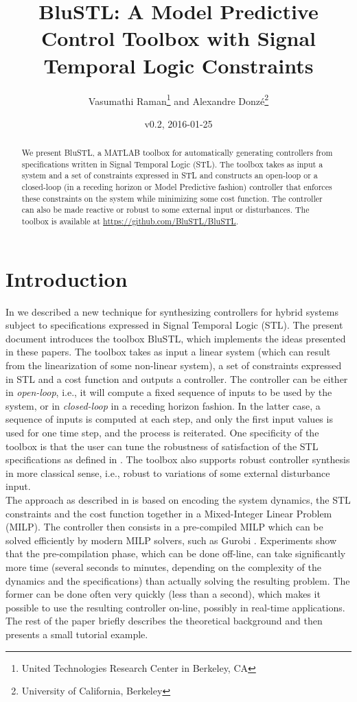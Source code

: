 \documentclass[hyperref, xcolor=dvipsnames, 10pt]{article} %
\title{BluSTL: A Model Predictive Control Toolbox with Signal Temporal Logic Constraints}
\author{
Vasumathi Raman\footnote{United Technologies Research Center in Berkeley, CA}\hspace{1ex}
 and Alexandre Donz\'e\footnote{University of California, Berkeley}
}
\date{v0.2, 2016-01-25 }
\begin{document}
\maketitle


\begin{abstract}
  We present BluSTL, a MATLAB toolbox for automatically generating controllers from
  specifications written in Signal Temporal Logic (STL). The toolbox takes as input a system and a
  set of constraints expressed in STL and constructs an open-loop or a closed-loop (in a receding
  horizon or Model Predictive fashion) controller that enforces these constraints on the system
  while minimizing some cost function. The controller can also be made reactive or robust to some
  external input or disturbances. The toolbox is available at \url{https://github.com/BluSTL/BluSTL}.
\end{abstract}

\section{Introduction}
In \cite{CDC14, HSCC15} we described a new technique for synthesizing controllers for hybrid systems
subject to specifications expressed in Signal Temporal Logic (STL). The present document introduces
the toolbox BluSTL, which implements the ideas presented in these papers. The toolbox takes as input
a linear system (which can result from the linearization of some non-linear system), a set
of constraints expressed in STL and a cost function and outputs a controller. The controller can be either in
\emph{open-loop}, i.e., it will compute a fixed sequence of inputs to be used by the system, or in
\emph{closed-loop} in a receding horizon fashion. In the latter case, a sequence of inputs is
computed at each step, and only the first input values is used for one time step, and the
process is reiterated. One specificity of the toolbox is that the user can tune the robustness of
satisfaction of the STL specifications as defined in \cite{DonzeM10}. The toolbox also supports
robust controller synthesis in more classical sense, i.e., robust to variations of some external
disturbance input.\\
 
The approach as described in \cite{CDC14,HSCC15} is based on encoding the system dynamics, the STL
constraints and the cost function together in a Mixed-Integer Linear Problem (MILP). The controller
then consists in a pre-compiled MILP which can be solved efficiently by modern MILP solvers, such as
Gurobi \cite{gurobi}. Experiments show that  the pre-compilation phase, which can be done
off-line, can take significantly more time (several seconds to minutes, depending on the complexity
of the dynamics and the specifications) than actually solving the resulting problem. The former can
be done often very quickly (less than a second), which makes it possible to use the resulting
controller on-line, possibly in real-time applications. The rest of the paper briefly describes the
theoretical background and then presents a small tutorial example.
\end{document}
